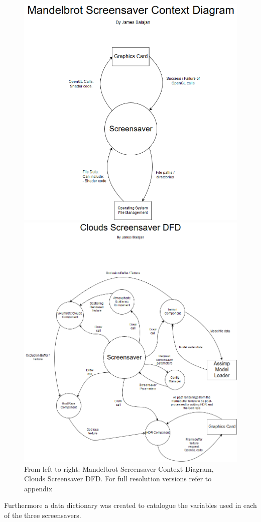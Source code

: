 \documentclass[10pt, openany]{book}
\begin{document}
\begin{figure}[H]
	\centering
	\begin{minipage}{.5\textwidth}
  		\centering
  		\includegraphics[width=.65\linewidth]{Mandelbrot Screensaver Context Diagram}  
	\end{minipage}%
	\begin{minipage}{.5\textwidth}
  		\centering
  		\includegraphics[width=.65\linewidth]{Clouds Screensaver DFD} 
	\end{minipage}
	\caption{From left to right: Mandelbrot Screensaver Context Diagram, Clouds Screensaver DFD. For full resolution versions refer to appendix}
\end{figure}

Furthermore a data dictionary was created to catalogue the variables used in each of the three screensavers.
\end{document}
